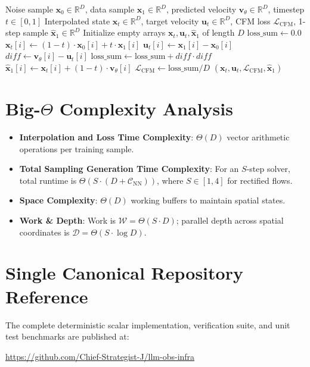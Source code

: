 \documentclass[11pt,a4paper]{article}
\theoremstyle{definition}
\begin{document}
\begin{algorithm}[H]
\caption{Flow Matching Interpolation and Straight-Line Objective Evaluation}
\begin{algorithmic}[1]
\Require Noise sample $\mathbf{x}_0 \in \mathbb{R}^D$, data sample $\mathbf{x}_1 \in \mathbb{R}^D$, predicted velocity $\mathbf{v}_\theta \in \mathbb{R}^D$, timestep $t \in [0, 1]$
\Ensure Interpolated state $\mathbf{x}_t \in \mathbb{R}^D$, target velocity $\mathbf{u}_t \in \mathbb{R}^D$, CFM loss $\mathcal{L}_{\text{CFM}}$, 1-step sample $\hat{\mathbf{x}}_1 \in \mathbb{R}^D$
\State Initialize empty arrays $\mathbf{x}_t, \mathbf{u}_t, \hat{\mathbf{x}}_1$ of length $D$
\State $\text{loss\_sum} \gets 0.0$
    \State $\mathbf{x}_t[i] \gets (1 - t) \cdot \mathbf{x}_0[i] + t \cdot \mathbf{x}_1[i]$
    \State $\mathbf{u}_t[i] \gets \mathbf{x}_1[i] - \mathbf{x}_0[i]$
    \State $diff \gets \mathbf{v}_\theta[i] - \mathbf{u}_t[i]$
    \State $\text{loss\_sum} \gets \text{loss\_sum} + diff \cdot diff$
    \State $\hat{\mathbf{x}}_1[i] \gets \mathbf{x}_t[i] + (1 - t) \cdot \mathbf{v}_\theta[i]$
\EndFor
\State $\mathcal{L}_{\text{CFM}} \gets \text{loss\_sum} / D$
\State \Return $(\mathbf{x}_t, \mathbf{u}_t, \mathcal{L}_{\text{CFM}}, \hat{\mathbf{x}}_1)$
\end{algorithmic}
\end{algorithm}

\section{Big-$\Theta$ Complexity Analysis}

\begin{itemize}
    \item \textbf{Interpolation and Loss Time Complexity}: $\Theta(D)$ vector arithmetic operations per training sample.
    \item \textbf{Total Sampling Generation Time Complexity}: For an $S$-step solver, total runtime is $\Theta(S \cdot (D + \mathcal{C}_{\text{NN}}))$, where $S \in [1, 4]$ for rectified flows.
    \item \textbf{Space Complexity}: $\Theta(D)$ working buffers to maintain spatial states.
    \item \textbf{Work \& Depth}: Work is $\mathcal{W} = \Theta(S \cdot D)$; parallel depth across spatial coordinates is $\mathcal{D} = \Theta(S \cdot \log D)$.
\end{itemize}

\section{Single Canonical Repository Reference}

The complete deterministic scalar implementation, verification suite, and unit test benchmarks are published at:
\begin{center}
\url{https://github.com/Chief-Strategist-J/llm-obs-infra}
\end{center}
\end{document}

